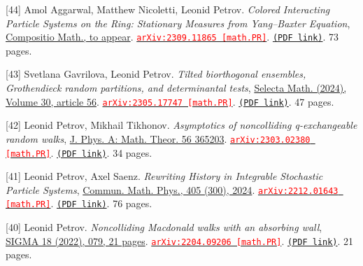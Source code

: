 \begin{etaremune}
\item[{[44]}] 
Amol Aggarwal, Matthew Nicoletti, Leonid Petrov.
\emph{Colored Interacting Particle Systems on the Ring: Stationary Measures from Yang--Baxter Equation}, \href{}{Compositio Math., to appear}. 
\href{https://arxiv.org/abs/2309.11865}{\texttt{{\textcolor{red}{arXiv:2309.11865 [math.PR]}}}}. \href{https://storage.lpetrov.cc/papers/44-colored_interacting_particle.pdf}{\texttt{(PDF link)}}. 73 pages.









\item[{[43]}] 
Svetlana Gavrilova, Leonid Petrov.
\emph{Tilted biorthogonal ensembles, Grothendieck random partitions, and determinantal tests}, \href{https://link.springer.com/article/10.1007/s00029-024-00945-3}{Selecta Math. (2024), Volume 30, article 56}. 
\href{https://arxiv.org/abs/2305.17747}{\texttt{{\textcolor{red}{arXiv:2305.17747 [math.PR]}}}}. \href{https://storage.lpetrov.cc/papers/43-tilted_biorthogonal_ensembles.pdf}{\texttt{(PDF link)}}. 47 pages.







\item[{[42]}] 
Leonid Petrov, Mikhail Tikhonov.
\emph{Asymptotics of noncolliding q-exchangeable random walks}, \href{https://iopscience.iop.org/article/10.1088/1751-8121/acedda}{J. Phys. A: Math. Theor. 56 365203}. 
\href{https://arxiv.org/abs/2303.02380}{\texttt{{\textcolor{red}{arXiv:2303.02380 [math.PR]}}}}. \href{https://storage.lpetrov.cc/papers/42-asymptotics_of_noncolliding.pdf}{\texttt{(PDF link)}}. 34 pages.





\item[{[41]}] 
Leonid Petrov, Axel Saenz.
\emph{Rewriting History in Integrable Stochastic Particle Systems}, \href{https://link.springer.com/article/10.1007/s00220-024-05189-y}{Commun. Math. Phys., 405 (300), 2024}. 
\href{https://arxiv.org/abs/2212.01643}{\texttt{{\textcolor{red}{arXiv:2212.01643 [math.PR]}}}}. \href{https://storage.lpetrov.cc/papers/41-rewriting_history_in.pdf}{\texttt{(PDF link)}}. 76 pages.









\item[{[40]}] 
Leonid Petrov.
\emph{Noncolliding Macdonald walks with an absorbing wall}, \href{https://www.emis.de/journals/SIGMA/2022/079/}{SIGMA 18 (2022), 079, 21 pages}. 
\href{https://arxiv.org/abs/2204.09206}{\texttt{{\textcolor{red}{arXiv:2204.09206 [math.PR]}}}}. \href{https://storage.lpetrov.cc/papers/40-noncolliding_macdonald_walks.pdf}{\texttt{(PDF link)}}. 21 pages.




\end{etaremune}
